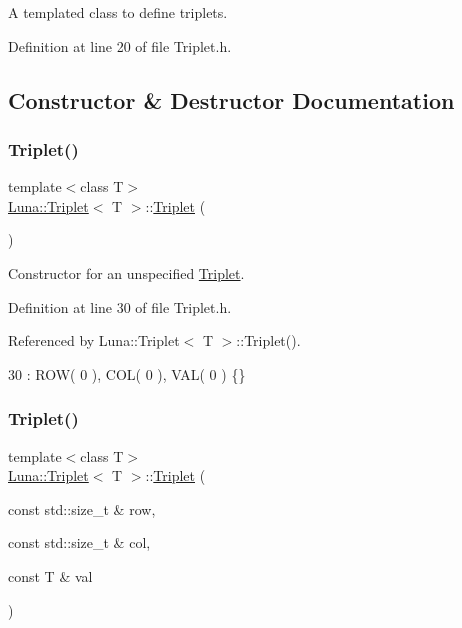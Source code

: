 A templated class to define triplets. 

Definition at line 20 of file Triplet.\+h.



\subsection{Constructor \& Destructor Documentation}
\mbox{\label{classLuna_1_1Triplet_a28f240b4dbca519a16bbe7de02710576}} 
\subsubsection{\texorpdfstring{Triplet()}{Triplet()}\hspace{0.1cm}{\footnotesize\ttfamily [1/3]}}
{\footnotesize\ttfamily template$<$class T$>$ \\
\hyperlink{classLuna_1_1Triplet}{Luna\+::\+Triplet}$<$ T $>$\+::\hyperlink{classLuna_1_1Triplet}{Triplet} (\begin{DoxyParamCaption}{ }\end{DoxyParamCaption})\hspace{0.3cm}{\ttfamily [inline]}}



Constructor for an unspecified \hyperlink{classLuna_1_1Triplet}{Triplet}. 



Definition at line 30 of file Triplet.\+h.



Referenced by Luna\+::\+Triplet$<$ T $>$\+::\+Triplet().


\begin{DoxyCode}
30 : ROW( 0 ), COL( 0 ), VAL( 0 ) \{\}
\end{DoxyCode}
\mbox{\label{classLuna_1_1Triplet_a18671ffc604a9999c3a4e1b0256d61af}} 
\subsubsection{\texorpdfstring{Triplet()}{Triplet()}\hspace{0.1cm}{\footnotesize\ttfamily [2/3]}}
{\footnotesize\ttfamily template$<$class T$>$ \\
\hyperlink{classLuna_1_1Triplet}{Luna\+::\+Triplet}$<$ T $>$\+::\hyperlink{classLuna_1_1Triplet}{Triplet} (\begin{DoxyParamCaption}\item[{const std\+::size\+\_\+t \&}]{row,  }\item[{const std\+::size\+\_\+t \&}]{col,  }\item[{const T \&}]{val }\end{DoxyParamCaption})\hspace{0.3cm}{\ttfamily [inline]}}



